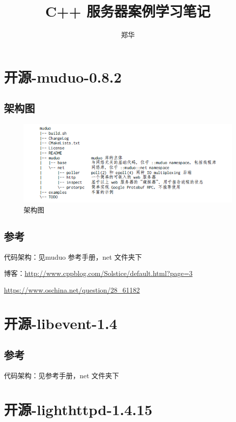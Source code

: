\documentclass[UTF8,a4paper,8pt]{ctexbook}
\author{郑华}
\title{C++  服务器案例学习笔记}
\begin{document}
 	\maketitle
 	\tableofcontents
\chapter{开源-muduo-0.8.2}	
	 \section{架构图}
		 \begin{figure}[h]
		 	\centering
		 	\includegraphics[scale = 0.7]{muduo.png}
		 	\caption{架构图}
		 \end{figure}
 
	 \section{参考}
		 代码架构：见muduo 参考手册，net 文件夹下
		 
		 博客：\url{http://www.cppblog.com/Solstice/default.html?page=3}
		 
			 \url{https://www.oschina.net/question/28_61182}
			
\chapter{开源-libevent-1.4}
	\section{参考}
		代码架构：见参考手册，net 文件夹下
	
\chapter{开源-lighthttpd-1.4.15}
\end{document}

